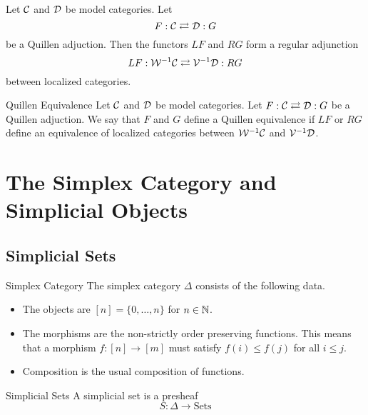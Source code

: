 \documentclass[a4paper]{article}
\begin{document}
\begin{prp}{}{} Let $\mathcal{C}$ and $\mathcal{D}$ be model categories. Let $$F:\mathcal{C}\rightleftarrows\mathcal{D}:G$$ be a Quillen adjuction. Then the functors $LF$ and $RG$ form a regular adjunction $$LF:\mathcal{W}^{-1}\mathcal{C}\rightleftarrows\mathcal{V}^{-1}\mathcal{D}:RG$$ between localized categories. 
\end{prp}

\begin{defn}{Quillen Equivalence}{} Let $\mathcal{C}$ and $\mathcal{D}$ be model categories. Let $F:\mathcal{C}\rightleftarrows\mathcal{D}:G$ be a Quillen adjuction. We say that $F$ and $G$ define a Quillen equivalence if $LF$ or $RG$ define an equivalence of localized categories between $\mathcal{W}^{-1}\mathcal{C}$ and $\mathcal{V}^{-1}\mathcal{D}$. 
\end{defn}

\pagebreak
\section{The Simplex Category and Simplicial Objects}
\subsection{Simplicial Sets}
\begin{defn}{Simplex Category}{} The simplex category $\Delta$ consists of the following data. 
\begin{itemize}
\item The objects are $[n]=\{0,\dots,n\}$ for $n\in\mathbb{N}$. 
\item The morphisms are the non-strictly order preserving functions. This means that a morphism $f:[n]\to[m]$ must satisfy $f(i)\leq f(j)$ for all $i\leq j$. 
\item Composition is the usual composition of functions. 
\end{itemize}
\end{defn}

\begin{defn}{Simplicial Sets}{} A simplicial set is a presheaf $$S:\Delta\to\text{Sets}$$ 
\end{defn}
\end{document}
